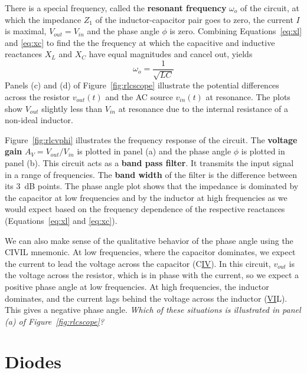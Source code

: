 \documentclass[11pt]{article}
\begin{document}
There is a special frequency, called the \textbf{resonant frequency}
$\omega_o$ of the circuit, at which the impedance $Z_1$ of the
inductor-capacitor pair goes to zero, the current $I$ is maximal,
$V_{out} = V_{in}$ and the phase angle $\phi$ is zero. Combining
Equations~\ref{eq:xl} and \ref{eq:xc} to find the the frequency at
which the capacitive and inductive reactances $X_L$ and $X_C$ have
equal magnitudes and cancel out, yields
\begin{equation}
  \omega_o = \frac{1}{\sqrt{LC}}
  \label{eq:rlcomega}
\end{equation}
Panels (c) and (d) of Figure~\ref{fig:rlcscope} illustrate the
potential differences across the resistor $v_{out}(t)$ and the AC
source $v_{in}(t)$ at resonance. The plots show $V_{out}$ slightly
less than $V_{in}$ at resonance due to the internal resistance of a
non-ideal inductor.

Figure~\ref{fig:rlcvphi} illustrates the frequency response of the
circuit. The \textbf{voltage gain} $A_V = V_{out}/V_{in}$ is plotted
in panel (a) and the phase angle $\phi$ is plotted in panel (b). This
circuit acts as a \textbf{band pass filter}. It transmits the input
signal in a range of frequencies. The \textbf{band width} of the
filter is the difference between its 3~dB points. The phase angle plot
shows that the impedance is dominated by the capacitor at low
frequencies and by the inductor at high frequencies as we would expect
based on the frequency dependence of the respective reactances
(Equations~\ref{eq:xl} and \ref{eq:xc}).

We can also make sense of the qualitative behavior of the phase angle
using the CIVIL mnemonic. At low frequencies, where the capacitor
dominates, we expect the current to lead the voltage across the
capacitor (C\underline{IV}). In this circuit, $v_{out}$ is the voltage
across the resistor, which is in phase with the current, so we expect
a positive phase angle at low frequencies. At high frequencies, the
inductor dominates, and the current lags behind the voltage across the
inductor (\underline{VI}L). This gives a negative phase
angle. \emph{Which of these situations is illustrated in panel (a) of
Figure~\ref{fig:rlcscope}?}

\newpage

\section{Diodes}
\label{sec:diodes}
\end{document}
